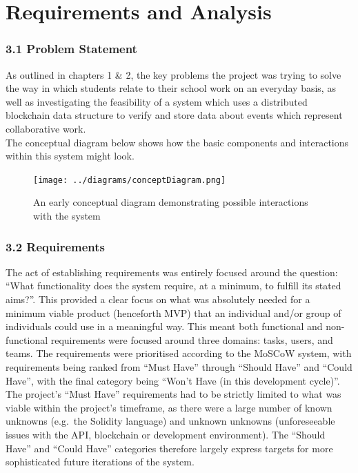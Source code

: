 \documentclass[12pt]{report}
\begin{document}
\chapter{Requirements and Analysis}

\subsection{3.1 Problem Statement}\label{problem-statement}

As outlined in chapters 1 \& 2, the key problems the project was trying
to solve the way in which students relate to their school work on an
everyday basis, as well as investigating the feasibility of a system
which uses a distributed blockchain data structure to verify and store
data about events which represent collaborative work.\\
The conceptual diagram below shows how the basic components and
interactions within this system might look.

\begin{figure}[htbp]
\centering
\texttt{[image: ../diagrams/conceptDiagram.png]}
\caption{An early conceptual diagram demonstrating possible interactions
with the system}
\end{figure}

\subsection{3.2 Requirements}\label{requirements}

The act of establishing requirements was entirely focused around the
question: ``What functionality does the system require, at a minimum, to
fulfill its stated aims?''. This provided a clear focus on what was
absolutely needed for a minimum viable product (henceforth
MVP)\cite{ries2009minimum} that an individual and/or group of individuals could use in
a meaningful way. This meant both functional and non-functional
requirements were focused around three domains: tasks, users, and teams.
The requirements were prioritised according to the MoSCoW
system\cite{1moscow},
with requirements being ranked from ``Must Have'' through ``Should
Have'' and ``Could Have'', with the final category being ``Won't Have
(in this development cycle)''. The project's ``Must Have'' requirements
had to be strictly limited to what was viable within the project's
timeframe, as there were a large number of known unknowns (e.g.~the
Solidity language) and unknown unknowns (unforeseeable issues with the
API, blockchain or development environment). The ``Should Have'' and
``Could Have'' categories therefore largely express targets for more
sophisticated future iterations of the system.
\end{document}
